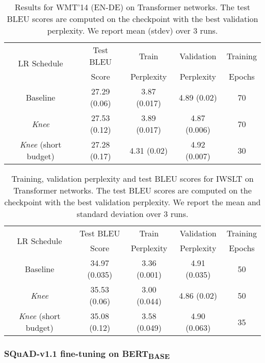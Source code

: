 \documentclass[twoside,11pt]{article}
\newcommand{\lrscheduleshort}{\textit{Knee}}
\begin{document}
\vspace{-4pt}
\begin{table}[h]
\captionsetup{type=table} \small
\centering
\caption{Results for WMT'14 (EN-DE) on Transformer networks. The test BLEU scores are computed on the checkpoint with the best validation perplexity. We report mean (stdev) over 3 runs.}
\label{tab:wmt_results}
\begin{tabular}{ccccc}
\toprule
  \multirow{2}{*}{LR Schedule} & Test BLEU  & Train & Validation  & Training \\
  &  Score & Perplexity  & Perplexity & Epochs \\ 
 \midrule
Baseline   &  27.29 (0.06) & 3.87 (0.017) & 4.89 (0.02) & 70 \\
\lrscheduleshort{}  & 27.53 (0.12) & 3.89 (0.017) & 4.87 (0.006) & 70 \\ 
\lrscheduleshort{} (short budget) & 27.28 (0.17) & 4.31 (0.02) & 4.92 (0.007)  & 30\\
\bottomrule
\end{tabular}

\end{table}
\vspace{10pt}
\begin{table}[th]
  \centering
  \small
\caption{Training, validation perplexity and test BLEU scores for IWSLT on Transformer networks. The test BLEU scores are computed on the checkpoint with the best validation perplexity. We report the mean and standard deviation over 3 runs.} 
\label{tab:iwslt_results}
\begin{tabular}{ccccc}
\toprule
  \multirow{2}{*}{LR Schedule} & Test BLEU  & Train & Validation  & Training \\
  &  Score & Perplexity  & Perplexity & Epochs \\ 
 \midrule
Baseline   &  34.97 (0.035) & 3.36 (0.001) & 4.91 (0.035) & 50 \\
\lrscheduleshort{}  & 35.53 (0.06) & 3.00 (0.044) & 4.86 (0.02) & 50 \\ 
\lrscheduleshort{} (short budget) & 35.08 (0.12) & 3.58 (0.049) & 4.90 (0.063)  & 35\\

\bottomrule
\end{tabular}
\end{table}

\subsubsection{SQuAD-v1.1 fine-tuning on BERT\textsubscript{BASE}}
\end{document}
